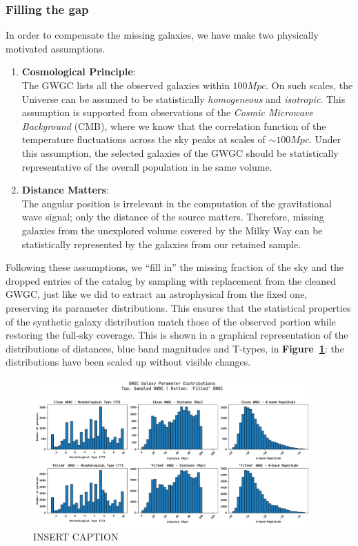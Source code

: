\subsubsection{Filling the gap}
In order to compensate the missing galaxies, we have make two physically motivated assumptions.
\begin{enumerate}
    \item \textbf{Cosmological Principle}:\\
    The GWGC lists all the observed galaxies within $100Mpc$.
    On such scales, the Universe can be assumed to be statistically \textit{homogeneous} and \textit{isotropic}. 
    This assumption is supported from observations of the \textit{Cosmic Microwave Background} (CMB), where we know that the correlation function of the temperature fluctuations across the sky peaks at scales of $\sim100Mpc$. 
    Under this assumption, the selected galaxies of the GWGC should be statistically representative of the overall population in he same volume.
    \item \textbf{Distance Matters}:\\ 
    The angular position is irrelevant in the computation of the gravitational wave signal; only the distance of the source matters.
    Therefore, missing galaxies from the unexplored volume covered by the Milky Way can be statistically represented by the galaxies from our retained sample.
\end{enumerate}
Following these assumptions, we “fill in” the missing fraction of the sky and the dropped entries of the catalog by sampling with replacement from the cleaned GWGC, just like we did to extract an astrophysical from the fixed one, preserving its parameter distributions.
This ensures that the statistical properties of the synthetic galaxy distribution match those of the observed portion while restoring the full-sky coverage. 
This is shown in a graphical representation of the distributions of distances, blue band magnitudes and T-types, in \textbf{Figure~\ref{fig: distro comparison}}: the distributions have been scaled up without visible changes.
\begin{figure}[h!]
    \begin{center}
        \includegraphics[width=0.95\textwidth]{images/distro_comparison.pdf}
    \end{center}
    \caption{INSERT CAPTION}\label{fig: distro comparison}
\end{figure}


